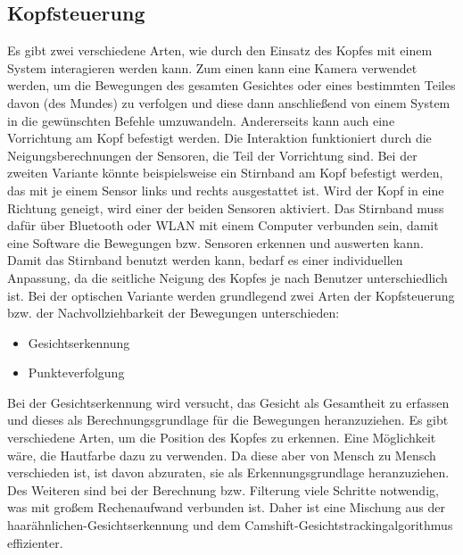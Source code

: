 \subsection{Kopfsteuerung}

Es gibt zwei verschiedene Arten, wie durch den Einsatz des Kopfes mit einem System interagieren werden kann. Zum einen kann eine Kamera verwendet werden, um die Bewegungen des gesamten Gesichtes oder eines bestimmten Teiles davon (\zB des Mundes) zu verfolgen und diese dann anschließend von einem System in die gewünschten Befehle umzuwandeln. Andererseits kann auch eine Vorrichtung am Kopf befestigt werden. Die Interaktion funktioniert durch die Neigungsberechnungen der Sensoren, die Teil der Vorrichtung sind.
\newline \newline
Bei der zweiten Variante könnte beispielsweise ein Stirnband am Kopf befestigt werden, das mit je einem Sensor links und rechts ausgestattet ist. Wird der Kopf in eine Richtung geneigt, wird einer der beiden Sensoren aktiviert. Das Stirnband muss dafür über Bluetooth oder WLAN mit einem Computer verbunden sein, damit eine Software die Bewegungen bzw. Sensoren erkennen und auswerten kann. Damit das Stirnband benutzt werden kann, bedarf es einer individuellen Anpassung, da die seitliche Neigung des Kopfes je nach Benutzer unterschiedlich ist.
\newline \newline
Bei der optischen Variante werden grundlegend zwei Arten der Kopfsteuerung bzw. der Nachvollziehbarkeit der Bewegungen unterschieden:
\begin{itemize}
      \item Gesichtserkennung
      \item Punkteverfolgung
\end{itemize}
\vspace{\baselineskip}
Bei der Gesichtserkennung wird versucht, das Gesicht als Gesamtheit zu erfassen und dieses als Berechnungsgrundlage für die Bewegungen heranzuziehen. Es gibt verschiedene Arten, um die Position des Kopfes zu erkennen. Eine Möglichkeit wäre, die Hautfarbe dazu zu verwenden. Da diese aber von Mensch zu Mensch verschieden ist, ist davon abzuraten, sie als Erkennungsgrundlage heranzuziehen. Des Weiteren sind bei der Berechnung bzw. Filterung viele Schritte notwendig, was mit großem \mbox{Rechenaufwand} verbunden ist. Daher ist eine Mischung aus der haarähnlichen-Gesichtserkennung und dem Camshift-Gesichtstrackingalgorithmus effizienter.
